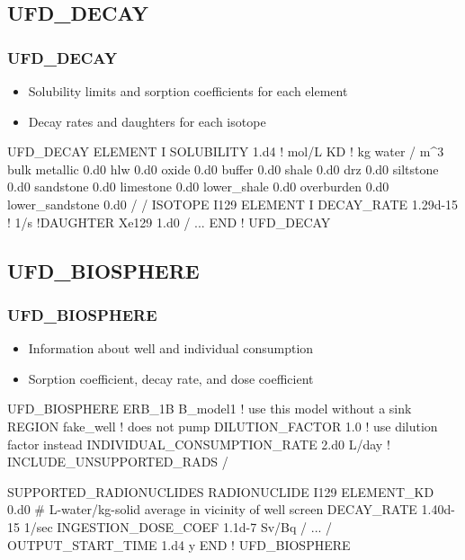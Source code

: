 \documentclass{beamer}
\newcommand\bluecomment[1]{{{\color{blue} #1}}}
\begin{document}
\subsection{UFD\_DECAY}
\begin{frame}[fragile]\frametitle{UFD\_DECAY}

\begin{itemize}
  \item Solubility limits and sorption coefficients for each element
  \item Decay rates and daughters for each isotope
\end{itemize}

\begin{semiverbatim}\small
UFD_DECAY
  ELEMENT I
    SOLUBILITY 1.d4 \bluecomment{! mol/L}
    KD \bluecomment{! kg water / m^3 bulk}
      metallic 0.d0
      hlw 0.d0
      oxide 0.d0
      buffer 0.d0
      shale 0.d0
      drz 0.d0
      siltstone 0.d0
      sandstone 0.d0
      limestone 0.d0
      lower_shale 0.d0
      overburden 0.d0
      lower_sandstone 0.d0
    /
  /
  ISOTOPE I129
    ELEMENT I
    DECAY_RATE 1.29d-15 \bluecomment{! 1/s}
    \bluecomment{!DAUGHTER Xe129 1.d0}
  /
  \bluecomment{...}
END \bluecomment{! UFD_DECAY}
\end{semiverbatim}
\end{frame}

\subsection{UFD\_BIOSPHERE}
\begin{frame}[fragile]\frametitle{UFD\_BIOSPHERE}

\begin{itemize}
  \item Information about well and individual consumption
  \item Sorption coefficient, decay rate, and dose coefficient
\end{itemize}

\begin{semiverbatim}\small
UFD_BIOSPHERE
  ERB_1B B_model1 \bluecomment{! use this model without a sink}
    REGION fake_well \bluecomment{! does not pump}
    DILUTION_FACTOR 1.0 \bluecomment{! use dilution factor instead}
    INDIVIDUAL_CONSUMPTION_RATE 2.d0 L/day
    \bluecomment{! INCLUDE_UNSUPPORTED_RADS}
  /

  SUPPORTED_RADIONUCLIDES
    RADIONUCLIDE I129
      ELEMENT_KD 0.d0  # L-water/kg-solid average in vicinity of well screen
      DECAY_RATE 1.40d-15 1/sec
      INGESTION_DOSE_COEF 1.1d-7 Sv/Bq
    /
    \bluecomment{...}
  /
  OUTPUT_START_TIME 1.d4 y
END \bluecomment{! UFD_BIOSPHERE}
\end{semiverbatim}
\end{frame}
\end{document}
